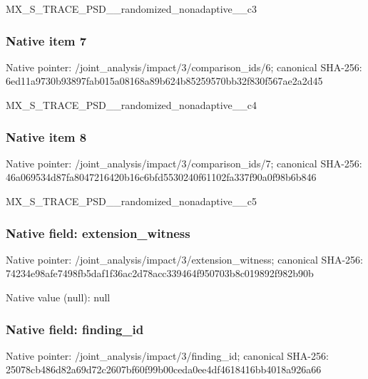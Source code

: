 \documentclass[10pt,a4paper]{article}
\begin{document}
\begingroup\raggedright\sloppy MX\_\allowbreak{}S\_\allowbreak{}TRACE\_\allowbreak{}PSD\_\allowbreak{}\_\allowbreak{}randomized\_\allowbreak{}nonadaptive\_\allowbreak{}\_\allowbreak{}c3\par\endgroup

\subsubsection{Native item 7}
Native pointer: /joint\_\allowbreak{}analysis/impact/3/comparison\_\allowbreak{}ids/6; canonical SHA-256: 6ed11a9730b93897fab015a08168a89b624b85259570bb32f830f567ae2a2d45

\begingroup\raggedright\sloppy MX\_\allowbreak{}S\_\allowbreak{}TRACE\_\allowbreak{}PSD\_\allowbreak{}\_\allowbreak{}randomized\_\allowbreak{}nonadaptive\_\allowbreak{}\_\allowbreak{}c4\par\endgroup

\subsubsection{Native item 8}
Native pointer: /joint\_\allowbreak{}analysis/impact/3/comparison\_\allowbreak{}ids/7; canonical SHA-256: 46a069534d87fa8047216420b16c6bfd5530240f61102fa337f90a0f98b6b846

\begingroup\raggedright\sloppy MX\_\allowbreak{}S\_\allowbreak{}TRACE\_\allowbreak{}PSD\_\allowbreak{}\_\allowbreak{}randomized\_\allowbreak{}nonadaptive\_\allowbreak{}\_\allowbreak{}c5\par\endgroup

\subsubsection{Native field: extension\_\allowbreak{}witness}
Native pointer: /joint\_\allowbreak{}analysis/impact/3/extension\_\allowbreak{}witness; canonical SHA-256: 74234e98afe7498fb5daf1f36ac2d78acc339464f950703b8c019892f982b90b

Native value (null): null

\subsubsection{Native field: finding\_\allowbreak{}id}
Native pointer: /joint\_\allowbreak{}analysis/impact/3/finding\_\allowbreak{}id; canonical SHA-256: 25078cb486d82a69d72c2607bf60f99b00ceda0ee4df4618416bb4018a926a66
\end{document}
